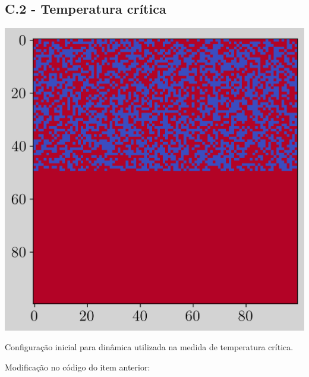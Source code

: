 \subsection{C.2 - Temperatura crítica }


\begin{marginfigure}
    \centering
    \includegraphics[width=\linewidth]{graficos/tarefa-3/graf-tarefa-C2-conf.png}
    \caption{Configuração inicial para dinâmica utilizada na medida de temperatura crítica.}
    \label{fig:c2_conf_inicial}
\end{marginfigure}


Modificação no código do item anterior: 




